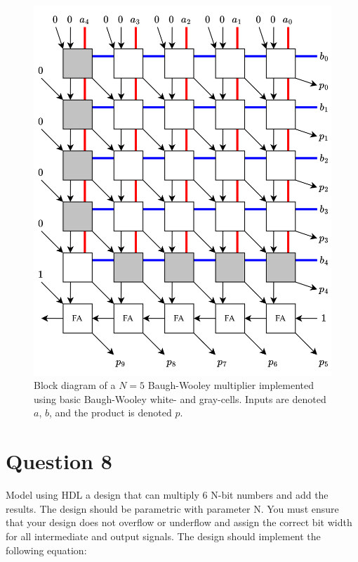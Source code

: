 \documentclass[../main.tex]{subfiles}
\begin{document}
\newpage

\begin{figure}[H]
    \centering
    \includegraphics[width=1.0\linewidth]{assets/bw_5bit_multiplier.png}
    \caption{Block diagram of a $N = 5$ Baugh-Wooley multiplier implemented using basic Baugh-Wooley white- and gray-cells. Inputs are denoted $a$, $b$, and the product is denoted $p$.}
    \label{q7}
\end{figure}

\newpage

\section{Question 8}

Model using HDL a design that can multiply 6 N-bit numbers and add the results. The design should be parametric with parameter N. You must ensure that your design does not overflow or underflow and assign the correct bit width for all intermediate and output signals. The design should implement the following equation:
\end{document}
